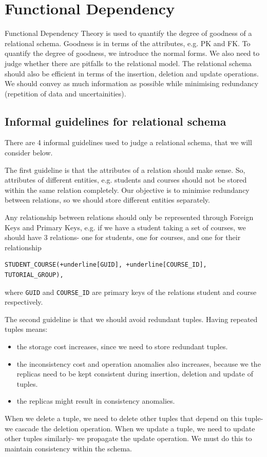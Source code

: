 \documentclass[a4paper, openany]{memoir}
\begin{document}
\newpage

\section{Functional Dependency}
Functional Dependency Theory is used to quantify the degree of goodness of a relational schema. Goodness is in terms of the attributes, e.g. PK and FK. To quantify the degree of goodness, we introduce the normal forms. We also need to judge whether there are pitfalls to the relational model. The relational schema should also be efficient in terms of the insertion, deletion and update operations. We should convey as much information as possible while minimising redundancy (repetition of data and uncertainities). 

\subsection{Informal guidelines for relational schema}
There are 4 informal guidelines used to judge a relational schema, that we will consider below.

The first guideline is that the attributes of a relation should make sense. So, attributes of different entities, e.g. students and courses should not be stored within the same relation completely. Our objective is to minimise redundancy between relations, so we should store different entities separately.

Any relationship between relations should only be represented through Foreign Keys and Primary Keys, e.g. if we have a student taking a set of courses, we should have 3 relations- one for students, one for courses, and one for their relationship 
\begin{Verbatim}[commandchars=+\[\]]
STUDENT_COURSE(+underline[GUID], +underline[COURSE_ID], TUTORIAL_GROUP),
\end{Verbatim}
where \texttt{GUID} and \texttt{COURSE\_ID} are primary keys of the relations student and course respectively.

The second guideline is that we should avoid redundant tuples. Having repeated tuples means:
\begin{itemize}
    \item the storage cost increases, since we need to store redundant tuples.
    \item the inconsistency cost and operation anomalies also increases, because we the replicas need to be kept consistent during insertion, deletion and update of tuples.
    \item the replicas might result in consistency anomalies.
\end{itemize}
When we delete a tuple, we need to delete other tuples that depend on this tuple- we cascade the deletion operation. When we update a tuple, we need to update other tuples similarly- we propagate the update operation. We must do this to maintain consistency within the schema.
\end{document}
